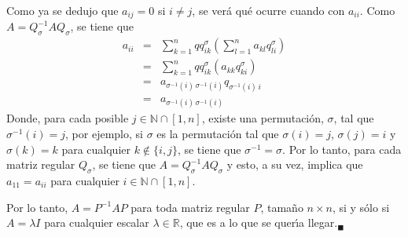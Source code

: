 \begin{solucion}
 Como ya se dedujo que $a_{ij} = 0$ si $i\neq j$, se ver\'a qu\'e ocurre cuando con $a_{ii}$. Como $A = Q^{-1}_{\sigma}AQ_{\sigma}$, se tiene que 
 \begin{eqnarray*}
  a_{ii} & = & \sum_{k=1}^n qq^{\sigma}_{ik} \left( \sum_{l=1}^n a_{kl}q^{\sigma}_{li} \right) \\
  & = & \sum_{k=1}^n qq^{\sigma}_{ik} \left( a_{kk}q^{\sigma}_{ki} \right) \\ 
  & = & a_{\sigma^{-1}(i)\, \sigma^{-1}(i)} q_{\sigma^{-1}(i)\, i} \\
  & = & a_{\sigma^{-1}(i)\, {\sigma^{-1}(i)}}
 \end{eqnarray*}
 Donde, para cada posible $j \in \mathbb{N}\cap[1,n]$, existe una permutaci\'on, $\sigma$, tal que $\sigma^{-1}(i) = j$, por ejemplo, si $\sigma$ es la permutaci\'on tal que $\sigma(i) = j$, $\sigma(j)=i$ y $\sigma(k) = k$ para cualquier $k\not\in \{i,j\}$, se tiene que $\sigma^{-1}=\sigma$. Por lo tanto, para cada matriz regular $Q_{\sigma}$, se tiene que $A = Q^{-1}_{\sigma}AQ_{\sigma}$ y esto, a su vez, implica que $a_{11} = a_{ii}$ para cualquier $i \in \mathbb{N}\cap[1,n]$. \par 
 Por lo tanto, $A = P^{-1}AP$ para toda matriz regular $P$, tama\~no $n\times n$, si y s\'olo si $A = \lambda I$ para cualquier escalar $\lambda \in \mathbb{R}$, que es a lo que se quer\'{\i}a llegar.${}_{\blacksquare}$
\end{solucion}

